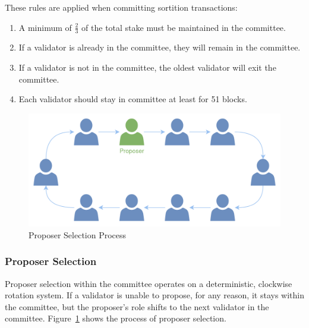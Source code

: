 \documentclass{novel}
\begin{document}
These rules are applied when committing sortition transactions:
\begin{enumerate}
  \item A minimum of $\frac{2}{3}$ of the total stake must be maintained in the committee.
  \item If a validator is already in the committee, they will remain in the committee.
  \item If a validator is not in the committee, the oldest validator will exit the committee.
  \item Each validator should stay in committee at least for 51 blocks.
\end{enumerate}
\begin{figure}[h]
	\centering
	\includegraphics[scale=0.25]{ps.png}
	\caption{Proposer Selection Process}
	\label{fig:ps}
	\centering
\end{figure}

\subsubsection{Proposer Selection}
Proposer selection within the committee operates on a deterministic, clockwise rotation system. If a validator is unable to propose, for any reason, it stays within the committee, but the proposer’s role shifts to the next validator in the committee. Figure~\ref{fig:ps} shows the process of proposer selection.
\end{document}
